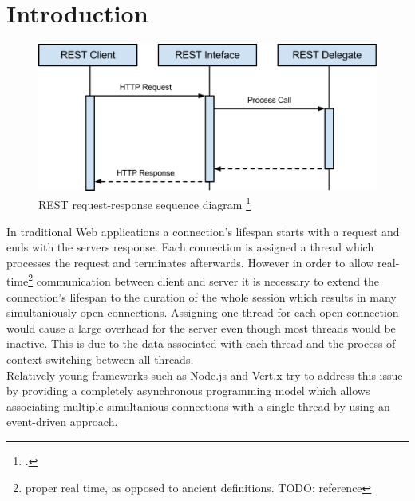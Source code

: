 

\title{\papertitle}
\author{Rocco Schulz, Max V\"{o}kler, Joe Boden,\\ Robert Wawrzyniak, Can Paul Bineytioglu\\\\
	Corporate State University\\Baden-Wuerttemberg - Stuttgart}

\date{\today}



\maketitle

\begin{abstract}
This paper evaluates asynchronous server technologies. Strenghts and weaknesses
of asynchronous programming models are elaborated and a proof of concept 
based on node.js and vert.x is used to evaluate non-functional attributes such as
maintainability. \ldots
\end{abstract}
\newpage

\tableofcontents
\newpage

\section{Introduction}

\begin{figure}[hbtp]
\centering
\includegraphics[scale=0.75]{img/image01.png}
\caption{REST request-response sequence diagram \footcite{req_res}\label{img_req_res}}
\end{figure}




In traditional Web applications a connection's lifespan starts with a request and
ends with the servers response. Each connection is assigned a thread which
processes the request and terminates afterwards.
However in order to allow real-time\footnote{proper real time, as opposed to
ancient definitions. TODO: reference} communication between client and server it
is necessary to extend the connection's lifespan to the duration of the whole
session which results in many simultaniously open connections.
Assigning one thread for each open connection would cause a large overhead for
the server even though most threads would be inactive. This is due to the data
associated with each thread and the process of context switching between all
threads.\\
Relatively young frameworks such as Node.js and Vert.x try to address this issue 
by providing a completely asynchronous programming model which allows associating
multiple simultanious connections with a single thread by using an event-driven approach.


